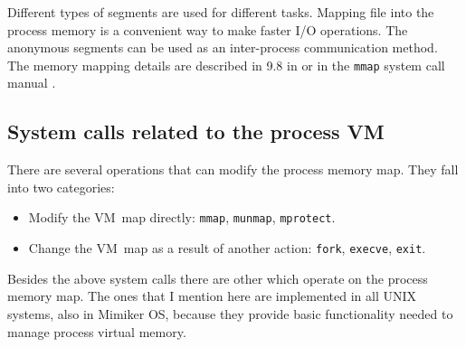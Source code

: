 Different types of segments are used for different tasks.
Mapping file into the process memory is a convenient way to make faster I/O operations. %
The anonymous segments can be used as an inter-process communication method.
The memory mapping details are described in 9.8 in \cite{csapp} or in the \texttt{mmap} system call manual \cite{man:freebsd}.

\subsection{System calls related to the process VM}

There are several operations that can modify the process memory map.
They fall into two categories:
\begin{itemize}
  \item Modify the VM~map directly: \texttt{mmap}, \texttt{munmap}, \texttt{mprotect}.
  \item Change the VM~map as a result of another action: \texttt{fork}, \texttt{execve}, \texttt{exit}.
\end{itemize}

Besides the above system calls there are other which operate on the process memory map.
The ones that I mention here are implemented in all UNIX systems, also in Mimiker OS,
because they provide basic functionality needed to manage process virtual memory.

